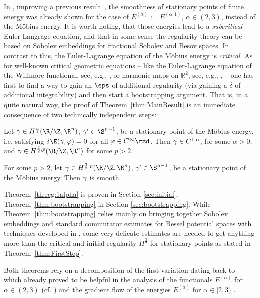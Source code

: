 In \cite{BlattReiterStationary11}, improving a previous result~\cite{ReiterOharaKnot11},
the smoothness of stationary points of finite energy was already shown
for the case of $E^{(\alpha)}:= E^{(\alpha,1)}$, $\alpha \in (2,3)$, instead of the M\"obius energy.
It is worth noting, that those energies lead to 
a \emph{subcritical} Euler-Langrage equation, and that in some sense the regularity theory can be based on  Sobolev 
embeddings for fractional Sobolev and Besov spaces. 
In contrast to this, the Euler-Lagrange equation of the M\"obius energy is \emph{critical}. As for 
well-known critical geometric equations -- like the Euler-Lagrange equation of the
Willmore functional, see, e.g., \cite{Simon1993, Riviere2006},
or harmonic maps on $\mathbb R^2$, see, e.g., \cite{Helein1991,Riviere2007}, -- one has first to find a way 
to gain an $\eps$ of additional regularity (via gaining a $\delta$ of additional integrability) and then start a bootstrapping argument.
That is, in a quite natural way, the proof of Theorem~\ref{thm:MainResult} is an immediate consequence of two technically independent steps:

\begin{theorem}\label{th:reg:1alpha} \label{thm:FirstStep}
Let $\soln \in H^{\frac{3}{2}}(\R /\Z,\R^\tdim)$, $\soln' \in \S^{\tdim-1}$, be a stationary point of the M\"obius energy, i.e. satisfying $\delta\E(\g,\varphi) = 0$ for all $\varphi\in C^\infty\rzd$.
Then $\gamma \in C^{1,\alpha}$, for some $\alpha > 0$, and  $\soln \in H^{\frac{3}{2},p}(\R /\Z,\R^\tdim)$ for some $p > 2$.
\end{theorem}

\begin{theorem}[Bootstrapping] \label{thm:bootstrapping}
 For some $p > 2$, let $\soln \in H^{\frac{3}{2},p}(\R /\Z,\R^\tdim)$, $\soln' \in \S^{\tdim-1}$,
 be a stationary point of the M\"obius energy. Then $\gamma$ is smooth.
\end{theorem}
Theorem~\ref{th:reg:1alpha} is proven in Section \ref{sec:initial}, Theorem~\ref{thm:bootstrapping} in Section \ref{sec:bootstrapping}.
While Theorem~\ref{thm:bootstrapping} relies mainly on bringing together Sobolev embeddings and 
standard commutator estimates for Bessel potential spaces with techniques developed in
\cite{Blatt2010a}, some very delicate estimates
are needed to get anything more than the critical and initial regularity $H^{\frac 3 2}$ for 
stationary points as stated in Theorem~\ref{thm:FirstStep}.

Both theorems rely on a decomposition of the first variation dating back to~\cite[Formula~(4.5)]{He2000} which 
already proved to be helpful in the analysis of the functionals 
$E^{(\alpha)}$ for $\alpha \in (2,3)$ (cf. \cite{BlattReiterStationary11}) and the gradient flow 
of the energies $E^{(\alpha)}$ for $\alpha \in [2,3)$ \cite{Blatt2011,Blatt2011c}. 

